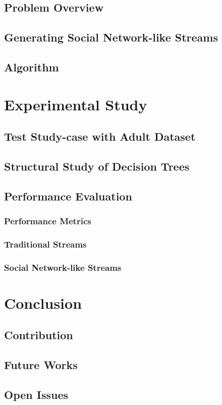 \documentclass[a4paper, 11pt, oneside]{book}
\begin{document}
\section{Problem Overview}
\section{Generating Social Network-like Streams}
\section{Algorithm}

\chapter{Experimental Study}
\section{Test Study-case with Adult Dataset}
\section{Structural Study of Decision Trees}
\section{Performance Evaluation}
\subsection{Performance Metrics}
\subsection{Traditional Streams}
\subsection{Social Network-like Streams}

\chapter{Conclusion}
\section{Contribution}
\section{Future Works}
\section{Open Issues}



\end{document}
